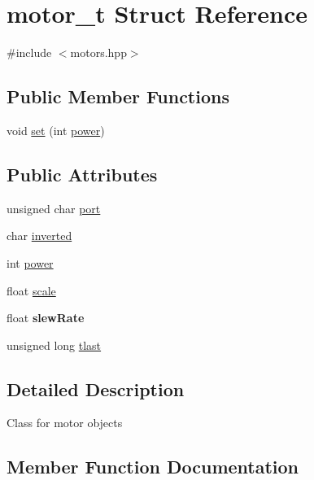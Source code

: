 \hypertarget{structmotor__t}{}\section{motor\+\_\+t Struct Reference}
\label{structmotor__t}


{\ttfamily \#include $<$motors.\+hpp$>$}

\subsection*{Public Member Functions}
\begin{DoxyCompactItemize}
\item 
void \hyperlink{structmotor__t_abbb5dde85e4548012cf8cf796093313f}{set} (int \hyperlink{structmotor__t_a7e84d55b013193d736b66bc4d213e98f}{power})
\end{DoxyCompactItemize}
\subsection*{Public Attributes}
\begin{DoxyCompactItemize}
\item 
unsigned char \hyperlink{structmotor__t_a5b2cb1644501c09be84743b375fd2071}{port}
\item 
char \hyperlink{structmotor__t_a151da94c1625feddc6dd621d7a97f64b}{inverted}
\item 
int \hyperlink{structmotor__t_a7e84d55b013193d736b66bc4d213e98f}{power}
\item 
float \hyperlink{structmotor__t_a313fd4008216d0d01b20dcf14ee83fb6}{scale}
\item 
\mbox{\label{structmotor__t_a226db167970cfe00376b7fbaca6e8d13}} 
float {\bfseries slew\+Rate}
\item 
unsigned long \hyperlink{structmotor__t_a4f00b961c42d53610d71bb90efdcd089}{tlast}
\end{DoxyCompactItemize}


\subsection{Detailed Description}
Class for motor objects 

\subsection{Member Function Documentation}
\mbox{\label{structmotor__t_abbb5dde85e4548012cf8cf796093313f}} 
